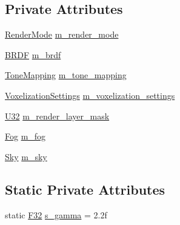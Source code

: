 \subsection*{Private Attributes}
\begin{DoxyCompactItemize}
\item 
\mbox{\hyperlink{namespacemage_1_1rendering_aeb14ce7610cc9391f4e01be027b91dcc}{Render\+Mode}} \mbox{\hyperlink{classmage_1_1rendering_1_1_camera_settings_adf563f8bd1ee5cecd126c6b4731de6e5}{m\+\_\+render\+\_\+mode}}
\item 
\mbox{\hyperlink{namespacemage_1_1rendering_ab8fe8684ca4bd74ba3a394b00cf125b5}{B\+R\+DF}} \mbox{\hyperlink{classmage_1_1rendering_1_1_camera_settings_a18daf9b9c8c7319e7db996a406aa0a43}{m\+\_\+brdf}}
\item 
\mbox{\hyperlink{namespacemage_1_1rendering_a789e4b7d9a8cc831b065e9c6bb7430e9}{Tone\+Mapping}} \mbox{\hyperlink{classmage_1_1rendering_1_1_camera_settings_a5a88df673aa475c5087bf74620048580}{m\+\_\+tone\+\_\+mapping}}
\item 
\mbox{\hyperlink{classmage_1_1rendering_1_1_voxelization_settings}{Voxelization\+Settings}} \mbox{\hyperlink{classmage_1_1rendering_1_1_camera_settings_a4d4cc0955f6bac39a57382a15fe81d64}{m\+\_\+voxelization\+\_\+settings}}
\item 
\mbox{\hyperlink{namespacemage_aa5d6eaabaac3cdd01873d6a3d27e90f3}{U32}} \mbox{\hyperlink{classmage_1_1rendering_1_1_camera_settings_ab6d4995fe7531563c5c5c8db1a0a1c9f}{m\+\_\+render\+\_\+layer\+\_\+mask}}
\item 
\mbox{\hyperlink{classmage_1_1rendering_1_1_fog}{Fog}} \mbox{\hyperlink{classmage_1_1rendering_1_1_camera_settings_a173329d1022c717efe29e33eaa554d18}{m\+\_\+fog}}
\item 
\mbox{\hyperlink{classmage_1_1rendering_1_1_sky}{Sky}} \mbox{\hyperlink{classmage_1_1rendering_1_1_camera_settings_a62c726791db2c8ee20ef404e15c5f26c}{m\+\_\+sky}}
\end{DoxyCompactItemize}
\subsection*{Static Private Attributes}
\begin{DoxyCompactItemize}
\item 
static \mbox{\hyperlink{namespacemage_aa97e833b45f06d60a0a9c4fc22ae02c0}{F32}} \mbox{\hyperlink{classmage_1_1rendering_1_1_camera_settings_add0c4a63661e6cbfed40f6f3267d72d5}{s\+\_\+gamma}} = 2.\+2f
\end{DoxyCompactItemize}


